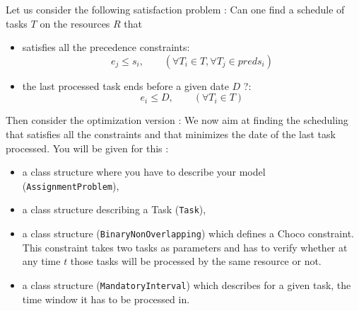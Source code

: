 Let us consider the following satisfaction problem : Can one find a schedule of tasks $T$ on the resources $R$ that
\begin{itemize}
\item satisfies all the precedence constraints:
  $$ e_j\le s_i,\qquad (\forall T_i\in T, \forall T_j\in preds_i)$$
\item the last processed task ends before a given date $D$ ?:
  $$ e_i\le D,\qquad (\forall T_i\in T)$$
\end{itemize}

Then consider the optimization version : We now aim at finding the scheduling that satisfies all the constraints and that minimizes the date of the last task processed.
You will be given for this :
\begin{itemize}
\item a class structure where you have to describe your model (\texttt{AssignmentProblem}),
\item a class structure describing a Task (\texttt{Task}),
\item a class structure (\texttt{BinaryNonOverlapping}) which defines a Choco constraint. This constraint takes two tasks as parameters and has to verify whether at any time $t$ those tasks will be processed by the same resource or not.
\item a class structure (\texttt{MandatoryInterval}) which describes for a given task, the time window it has to be processed in.
\end{itemize}

